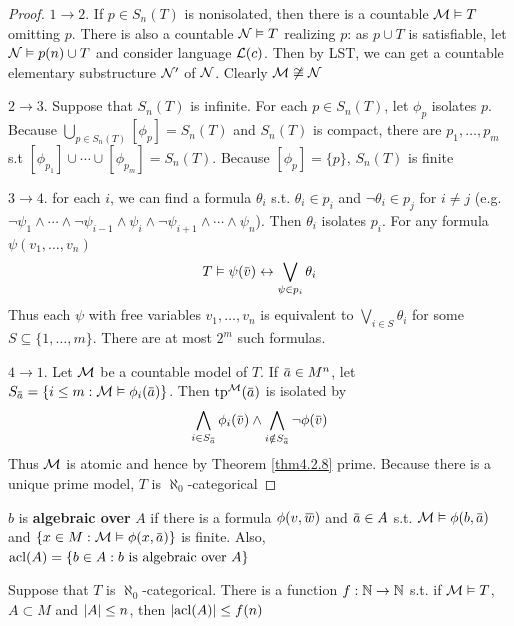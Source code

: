 \documentclass[11pt]{article}
\begin{document}
\begin{proof}
\(1\to 2\). If \(p\in S_n(T)\) is nonisolated, then there is a countable \(\mathcal{M}\vDash T\) omitting \(p\).
There is also a countable \(\mathcal{N}\vDash T\) realizing \(p\): as \(p\cup T\) is satisfiable,
let \(\mathcal{N}\vDash p(n)\cup T\) and consider language \(\mathcal{L}(c)\). Then by LST, we can get a countable
elementary substructure \(\mathcal{N}'\) of \(\mathcal{N}\). Clearly \(\mathcal{M}\not\cong\mathcal{N}\)

\(2\to 3\). Suppose that \(S_n(T)\) is infinite. For each \(p\in S_n(T)\), let \(\phi_p\)
isolates \(p\). Because \(\bigcup_{p\in S_n(T)}[\phi_p]=S_n(T)\) and \(S_n(T)\) is compact, there
are \(p_1,\dots,p_m\) s.t \([\phi_{p_1}]\cup\cdots\cup[\phi_{p_m}]=S_n(T)\). Because \([\phi_p]=\{p\}\), \(S_n(T)\) is
finite

\(3\to 4\). for each \(i\), we can find a formula \(\theta_i\) s.t. \(\theta_i\in p_i\) and \(\neg\theta_i\in p_j\)
for \(i\neq j\) (e.g. \(\neg\psi_1\wedge\cdots\wedge\neg\psi_{i-1}\wedge\psi_i\wedge\neg\psi_{i+1}\wedge\cdots\wedge\psi_n\)). Then \(\theta_i\) isolates \(p_i\). For any
formula \(\psi(v_1,\dots,v_n)\)
\begin{equation*}
T\vDash\psi(\barv)\leftrightarrow\bigvee_{\psi\in p_i}\theta_i
\end{equation*}
Thus each \(\psi\) with free variables \(v_1,\dots,v_n\) is equivalent to \(\bigvee_{i\in S}\theta_i\) for
some \(S\subseteq\{1,\dots,m\}\). There are at most \(2^m\) such formulas.

\(4\to 1\). Let \(\mathcal{M}\) be a countable model of \(T\). If \(\bara\in M^n\),
let \(S_{\bara}=\{i\le m:\calm\vDash\phi_i(\bara)\}\). Then \(\tp^{\calm}(\bara)\) is isolated by
\begin{equation*}
\bigwedge_{i\in S_{\bara}}\phi_i(\barv)\wedge\bigwedge_{i\notin S_{\bara}}\neg\phi(\barv)
\end{equation*}
Thus \(\mathcal{M}\) is atomic and hence by Theorem \ref{thm4.2.8} prime. Because there is a unique prime
model, \(T\) is \(\aleph_0\)-categorical
\end{proof}

\(b\) is \textbf{algebraic over} \(A\) if there is a formula \(\phi(v,\barw)\) and \(\bara\in A\)
s.t. \(\calm\vDash\phi(b,\bara)\) and \(\{x\in M:\calm\vDash\phi(x,\bara)\}\) is finite.
Also, \(\operatorname{acl}(A)=\{b\in A:b\text{ is algebraic over }A\}\)

\begin{corollary}[]
\label{cor4.4.2}
Suppose that \(T\) is \(\aleph_0\)-categorical. There is a function \(f:\mathbb{N}\to\mathbb{N}\) s.t.
if \(\mathcal{M}\vDash T\), \(A\subset M\) and \(\abs{A}\le n\), then \(\abs{\acl(A)}\le f(n)\)
\end{corollary}
\end{document}
